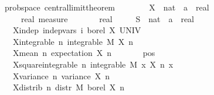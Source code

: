 \documentclass{article}
\begin{document}
\begin{figure}
\begin{isabellebody}
\isamarkupfalse%
\ {\isacharparenleft}\ prob{\isacharunderscore}space{\isacharparenright}\ central{\isacharunderscore}limit{\isacharunderscore}theorem{\isacharcolon}\isanewline
\ \ \ \isanewline
\ \ \ \ X\ {\isacharcolon}{\isacharcolon}\ {\isachardoublequoteopen}nat\ {\isasymRightarrow}\ {\isacharprime}a\ {\isasymRightarrow}\ real{\isachardoublequoteclose}\ \isanewline
\ \ \ \ {\isasymmu}\ {\isacharcolon}{\isacharcolon}\ {\isachardoublequoteopen}real\ measure{\isachardoublequoteclose}\ \isanewline
\ \ \ \ {\isasymsigma}\ {\isacharcolon}{\isacharcolon}\ real\ \isanewline
\ \ \ \ S\ {\isacharcolon}{\isacharcolon}\ {\isachardoublequoteopen}nat\ {\isasymRightarrow}\ {\isacharprime}a\ {\isasymRightarrow}\ real{\isachardoublequoteclose}\isanewline
\ \ \isanewline
\ \ \ \ X{\isacharunderscore}indep{\isacharcolon}\ {\isachardoublequoteopen}indep{\isacharunderscore}vars\ {\isacharparenleft}{\isasymlambda}i{\isachardot}\ borel{\isacharparenright}\ X\ UNIV{\isachardoublequoteclose}\ \isanewline
\ \ \ \ X{\isacharunderscore}integrable{\isacharcolon}\ {\isachardoublequoteopen}{\isasymAnd}n{\isachardot}\ integrable\ M\ {\isacharparenleft}X\ n{\isacharparenright}{\isachardoublequoteclose}\ \isanewline
\ \ \ \ X{\isacharunderscore}mean{\isacharunderscore}{}{\isacharcolon}\ {\isachardoublequoteopen}{\isasymAnd}n{\isachardot}\ expectation\ {\isacharparenleft}X\ n{\isacharparenright}\ {\isacharequal}\ {}{\isachardoublequoteclose}\ \isanewline
\ \ \ \ {\isasymsigma}{\isacharunderscore}pos{\isacharcolon}\ {\isachardoublequoteopen}{\isasymsigma}\ {\isachargreater}\ {}{\isachardoublequoteclose}\ \isanewline
\ \ \ \ X{\isacharunderscore}square{\isacharunderscore}integrable{\isacharcolon}\ {\isachardoublequoteopen}{\isasymAnd}n{\isachardot}\ integrable\ M\ {\isacharparenleft}{\isasymlambda}x{\isachardot}\ {\isacharparenleft}X\ n\ x{\isacharparenright}\ \isanewline
\ \ \ \ X{\isacharunderscore}variance{\isacharcolon}\ {\isachardoublequoteopen}{\isasymAnd}n{\isachardot}\ variance\ {\isacharparenleft}X\ n{\isacharparenright}\ {\isacharequal}\ {\isasymsigma}\ \isanewline
\ \ \ \ X{\isacharunderscore}distrib{\isacharcolon}\ {\isachardoublequoteopen}{\isasymAnd}n{\isachardot}\ distr\ M\ borel\ {\isacharparenleft}X\ n{\isacharparenright}\ {\isacharequal}\ {\isasymmu}{\isachardoublequoteclose}\isanewline

\end{isabellebody}
\end{figure}
\end{document}
